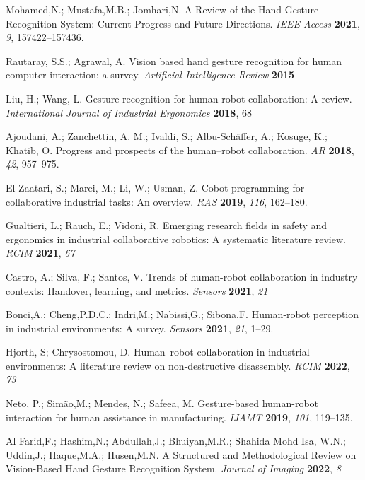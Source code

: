 \begin{thebibliography}{999}

Mohamed,N.; Mustafa,M.B.; Jomhari,N. A Review of the Hand Gesture Recognition System: Current Progress and Future Directions. {\em IEEE Access} {\bf 2021}, {\em 9}, 157422--157436.

Rautaray, S.S.; Agrawal, A.  Vision based hand gesture recognition for human computer interaction: a survey. {\em Artificial Intelligence Review} {\bf 2015}

Liu, H.; Wang, L.  Gesture recognition for human-robot collaboration: A review. {\em International Journal of Industrial Ergonomics} {\bf 2018}, {68}

Ajoudani, A.;  Zanchettin, A. M.; Ivaldi, S.; Albu-Schäffer, A.; Kosuge, K.; Khatib, O. Progress and prospects of the human–robot collaboration. {\em AR} {\bf 2018}, {\em 42}, 957--975.

El Zaatari, S.; Marei, M.; Li, W.; Usman, Z. Cobot programming for collaborative industrial tasks: An overview. {\em RAS} {\bf 2019}, {\em 116}, 162--180.

Gualtieri, L.; Rauch, E.; Vidoni, R. Emerging research fields in safety and ergonomics in industrial collaborative robotics: A systematic literature review. {\em RCIM} {\bf 2021}, {\em 67}

Castro, A.; Silva, F.; Santos, V. Trends of human-robot collaboration in industry contexts: Handover, learning, and metrics. {\em Sensors} {\bf 2021}, {\em 21}

Bonci,A.; Cheng,P.D.C.; Indri,M.; Nabissi,G.; Sibona,F. Human-robot perception in industrial environments: A survey. {\em Sensors} {\bf 2021}, {\em 21}, 1--29.

Hjorth, S; Chrysostomou, D. Human–robot collaboration in industrial environments: A literature review on non-destructive disassembly. {\em RCIM} {\bf 2022}, {\em 73}

Neto, P.; Simão,M.; Mendes, N.; Safeea, M. Gesture-based human-robot interaction for human assistance in manufacturing. {\em IJAMT} {\bf 2019}, {\em 101}, 119--135.

Al Farid,F.; Hashim,N.; Abdullah,J.; Bhuiyan,M.R.; Shahida Mohd Isa, W.N.; Uddin,J.; Haque,M.A.; Husen,M.N. A Structured and Methodological Review on Vision-Based Hand Gesture Recognition System. {\em Journal of Imaging} {\bf 2022}, {\em 8}


\end{thebibliography}
